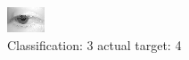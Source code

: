 \begin{figure}[h!]
\begin{center}
\includegraphics[width=0.60\columnwidth]{figures/ID2633_class_3_target_4.png}
\end{center}
\caption{ Classification: 3 actual target: 4}
\label{fig:ID2633_class_3_target_4}
\end{figure}
